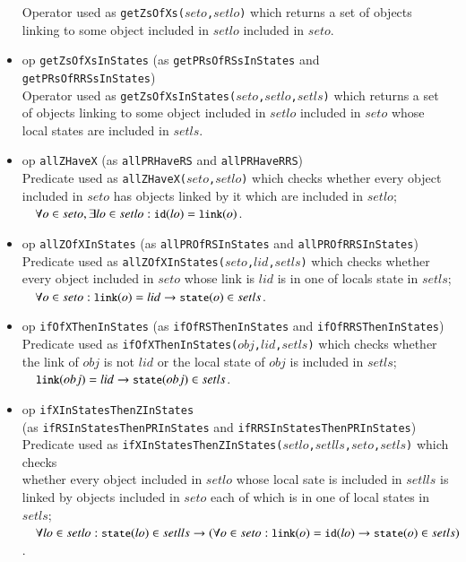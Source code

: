 \documentclass[12pt]{report}
\newcommand{\ra}{\rightarrow}
\newcommand{\mbstt}[1]{\mbox{\small{\tt {#1}}}}
\newcommand{\stt}[1]{{\small{\tt {#1}}}}
\begin{document}
\begin{itemize}
  Operator used as \stt{getZsOfXs($seto$,$setlo$)} which returns a set
  of objects linking to some object included in $setlo$ included in
  $seto$.
\item op \stt{getZsOfXsInStates} (as \stt{getPRsOfRSsInStates} and \stt{getPRsOfRRSsInStates})\\
  Operator used as \stt{getZsOfXsInStates($seto$,$setlo$,$setls$)}
  which returns a set of objects linking to some object included in
  $setlo$ included in $seto$ whose local states are included in
  $setls$.
\item op \stt{allZHaveX} (as \stt{allPRHaveRS} and \stt{allPRHaveRRS})\\
  Predicate used as \stt{allZHaveX($seto$,$setlo$)} which checks
  whether every object included in $seto$ has objects linked by it
  which are included in $setlo$;\\$~~~~\forall o\in seto,\exists lo\in
  setlo:\mbstt{id}(lo)=\mbstt{link}(o)$.
\item op \stt{allZOfXInStates} (as \stt{allPROfRSInStates} and \stt{allPROfRRSInStates})\\
  Predicate used as \stt{allZOfXInStates($seto$,$lid$,$setls$)} which
  checks whether every object included in $seto$ whose link is $lid$
  is in one of locals state in $setls$;\\$~~~~\forall o\in
  seto:\mbstt{link}(o)=lid\ra\mbstt{state}(o)\in setls$.
\item op \stt{ifOfXThenInStates} (as \stt{ifOfRSThenInStates} and \stt{ifOfRRSThenInStates})\\
  Predicate used as \stt{ifOfXThenInStates($obj$,$lid$,$setls$)} which
  checks whether the link of $obj$ is not $lid$ or the local state of
  $obj$ is included in
  $setls$;\\$~~~~\mbstt{link}(obj)=lid\ra\mbstt{state}(obj)\in setls$.
\item op \stt{ifXInStatesThenZInStates}\\
(as \stt{ifRSInStatesThenPRInStates} and \stt{ifRRSInStatesThenPRInStates})\\
  Predicate used as
  \stt{ifXInStatesThenZInStates($setlo$,$setlls$,$seto$,$setls$)}
  which checks\\ whether every object included in $setlo$ whose local
  sate is included in $setlls$ is linked by objects included in $seto$
  each of which is in one of local states in $setls$;\\$~~~~\forall
  lo\in setlo:\mbstt{state}(lo)\in setlls\ra(\forall o\in
  seto:\mbstt{link}(o)=\mbstt{id}(lo)\ra\mbstt{state}(o)\in setls)$.
\end{itemize}
\end{document}

